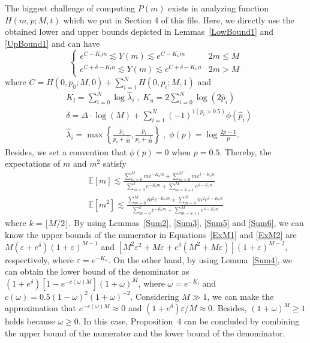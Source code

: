 \documentclass{article}
\begin{document}
The biggest challenge of computing $P(m)$ exists in analyzing function $H(m,p;M,t)$ which we put in Section 4 of this file. 
Here, we directly use the obtained lower and upper bounds  depicted in Lemmas~\ref{LowBound1} and \ref{UpBound1} and can have
\begin{equation}
\left\{
\begin{array}{lc}
e^{C-{K}_l m}\lesssim Y(m) \lesssim e^{C-K_u m} & 2m\leq M\\
e^{C+\delta-{K}_l  n}\lesssim Y(m) \lesssim e^{C+\delta-K_u n} & 2m>M
\end{array}
\right.
\end{equation}
where $C=H(0,p_0;M,0)+\sum_{i=1}^{N}H(0,p_i;M,1)$ and
\begin{equation*}
\begin{split}
&K_l = {\sum}_{i=0}^{N}\log \hat{\lambda}_{i}\;,\; K_u =  2{\sum}_{i=0}^{N}\log \left(2\hat{p}_i\right)\\
&\delta = \Delta\cdot \log(M)+{\sum}_{i=1}^{N}(-1)^{1(p_i>0.5)}\phi(\hat{p}_i)\\
&\hat{\lambda}_i=\max\left\{\frac{p_i}{\bar{p}_i+\frac{1}{M}},\frac{\bar{p}_i}{p_i+\frac{1}{M}}\right\}
\;,\;\phi (p) =\log\frac{2p-1}{p}.
\end{split}
\end{equation*}
Besides, we set a convention that $\phi(p)=0$ when $p=0.5$. Thereby, the expectations of $m$ and $m^2$ satisfy
\begin{align}
\mathbb{E}[m] \lesssim \frac{\sum_{m=0}^{M}me^{-K_u m}+\sum_{m=0}^{M}me^{\delta-K_u n}}{\sum_{m=0}^{k}e^{-K_l m}+\sum_{m=k+1}^{M}e^{\delta-K_l n}}
\label{ExM1}\\
\mathbb{E}[m^2] \lesssim \frac{\sum_{m=0}^{M}m^2e^{-K_u m}+\sum_{m=0}^{M}m^2e^{\delta-K_u n}}{\sum_{m=0}^{k}e^{-K_l m}+\sum_{m=k+1}^{M}e^{\delta-K_l n}} \label{ExM2}
\end{align}
where $k=\lfloor M/2 \rfloor$.
By using Lemmas~\ref{Sum2}, \ref{Sum3}, \ref{Sum5} and \ref{Sum6}, we can know the upper bounds of the numerator in Equations~\ref{ExM1} and \ref{ExM2} are $M(\varepsilon+e^{\delta})(1+\varepsilon)^{M-1}$ and $[M^2\varepsilon^2+M\varepsilon+e^{\delta}(M^2+M\varepsilon)](1+\varepsilon)^{M-2}$, respectively, where $\varepsilon=e^{-K_u}$. On the other hand, by using Lemma~\ref{Sum4}, we can obtain the lower bound of the denominator as $(1+e^{\delta})[1-e^{-c(\omega)M}](1+\omega)^{M}$, where $\omega=e^{-K_l}$ and $c(\omega)=0.5(1-\omega)^2(1+\omega)^{-2}$.
Considering $M\gg 1$, we can make the approximation that $e^{-c(\omega)M}\approx 0$ and $(1+e^\delta)\varepsilon/M\approx 0$. Besides, $(1+\omega)^{M}\geq 1$ holds because $\omega\geq 0$. In this case, Proposition~4 can be concluded by combining the upper bound of the numerator and the lower bound of the denominator.
\end{document}
